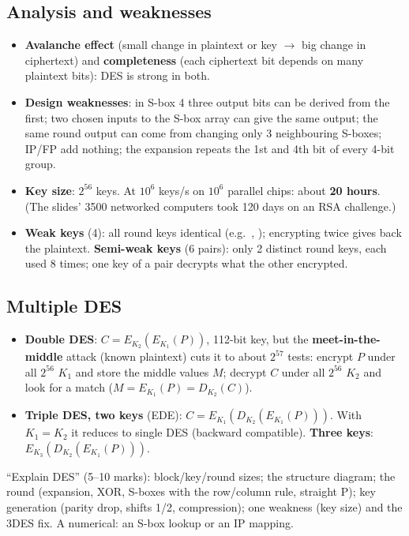 \subsection{Analysis and weaknesses}
\begin{itemize}
  \item \textbf{Avalanche effect} (small change in plaintext or key $\to$ big change in ciphertext) and \textbf{completeness} (each ciphertext bit depends on many plaintext bits): DES is strong in both.
  \item \textbf{Design weaknesses}: in S-box 4 three output bits can be derived from the first; two chosen inputs to the S-box array can give the same output; the same round output can come from changing only 3 neighbouring S-boxes; IP/FP add nothing; the expansion repeats the 1st and 4th bit of every 4-bit group.
  \item \textbf{Key size}: $2^{56}$ keys. At $10^6$ keys/s on $10^6$ parallel chips: about \textbf{20 hours}. (The slides' 3500 networked computers took 120 days on an RSA challenge.)
  \item \textbf{Weak keys} (4): all round keys identical (e.g.\ , ); encrypting twice gives back the plaintext. \textbf{Semi-weak keys} (6 pairs): only 2 distinct round keys, each used 8 times; one key of a pair decrypts what the other encrypted.
\end{itemize}

\subsection{Multiple DES}
\begin{itemize}
  \item \textbf{Double DES}: $C = E_{K_2}(E_{K_1}(P))$, 112-bit key, but the \textbf{meet-in-the-middle} attack (known plaintext) cuts it to about $2^{57}$ tests: encrypt $P$ under all $2^{56}$ $K_1$ and store the middle values $M$; decrypt $C$ under all $2^{56}$ $K_2$ and look for a match ($M = E_{K_1}(P) = D_{K_2}(C)$).
  \item \textbf{Triple DES, two keys} (EDE): $C = E_{K_1}(D_{K_2}(E_{K_1}(P)))$. With $K_1 = K_2$ it reduces to single DES (backward compatible). \textbf{Three keys}: $E_{K_3}(D_{K_2}(E_{K_1}(P)))$.
\end{itemize}

\begin{examtip}
``Explain DES'' (5--10 marks): block/key/round sizes; the structure diagram; the round (expansion, XOR, S-boxes with the row/column rule, straight P); key generation (parity drop, shifts 1/2, compression); one weakness (key size) and the 3DES fix. A numerical: an S-box lookup or an IP mapping.
\end{examtip}

